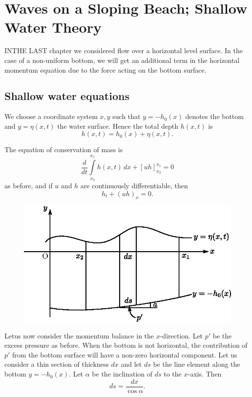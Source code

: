 
\chapter{Waves on a Sloping Beach; Shallow Water Theory}\label{chap5}

IN\pageoriginale THE LAST chapter we considered flow over a horizontal level surface. In the case of a non-uniform bottom, we will get an additional term in the horizontal momentum equation due to the force acting on the bottom surface.

\section{Shallow water equations}\label{chap5:sec5.1}

We choose a coordinate system $x,y$ such that $y=-h_0(x)$ denotes the bottom and $y=\eta(x,t)$ the water surface. Hence the total depth $h(x,t)$ is 
$$
h(x,t)=h_0(x)+\eta(x,t).
$$

The equation of conservation of mass is 
\begin{equation}
\frac{d}{dt}\int\limits_{x_2}^{x_1}h(x,t)\,dx+[uh]_{x_2}^{x_1}=0 \tag{5.1}\label{chap5:eq5.1}
\end{equation}
as before, and if $u$ and $h$ are continuously differentiable, then 
\begin{equation}
h_t+(uh)_x=0.\tag*{$(5.1)'$}\label{chap5:eq5.1'}
\end{equation}
\begin{figure}[H]
\centering
\includegraphics{figures/fig61-5.1.eps}
\caption{}
\label{chap1:fig5.1}
\end{figure}


Let\pageoriginale us now consider the momentum balance in the $x$-direction. Let $p'$ be the excess pressure as before. When the bottom is not horizontal, the contribution of $p'$ from the bottom surface will have a non-zero horizontal component. Let us consider a thin section of thickness $dx$ and let $ds$ be the line element along the bottom $y=-h_0(x)$. Let $\alpha$ be the inclination of $ds$ to the $x$-axis. Then 
$$
ds=\frac{dx}{\cos\alpha}.
$$

